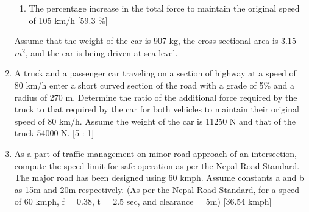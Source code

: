 \begin{enumerate}
\begin{enumerate}
			\item The percentage increase in the total force to maintain the original speed of 105 km/h [59.3 \%]
		\end{enumerate}
	Assume that the weight of the car is 907 kg, the cross-sectional area is 3.15 $ m^2 $, and the car is being driven at sea level.
	\item A truck and a passenger car traveling on a section of highway at a speed of 80 km/h enter a short curved section of the road with a grade of 5\% and a radius of 270 m. Determine the ratio of the additional force required by the truck to that required by the car for both vehicles to maintain their original speed of 80 km/h. Assume the weight of the car is 11250 N and that of the truck 54000 N. [5 : 1]
	\item As a part of traffic management on minor road approach of an intersection, compute the speed limit for safe operation as per the Nepal Road Standard. The major road has been designed using 60 kmph. Assume constants a and b as 15m and 20m respectively. (As per the Nepal Road Standard, for a speed of 60 kmph, f = 0.38, t = 2.5 sec, and clearance = 5m) [36.54 kmph]
\end{enumerate}




